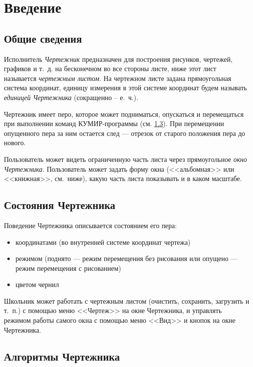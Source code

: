 \documentclass[12pt,a4paper]{article}
\begin{document}

\section{Введение}

\subsection{Общие сведения}

Исполнитель \emph{Чертежник} предназначен для построения рисунков, чертежей, графиков и т.~д. на бесконечном во все стороны листе, ниже этот лист называется  \emph{чертежным \mbox{листом}}. На чертежном листе  задана прямоугольная система координат, единицу измерения в этой системе координат будем называть \emph{единицей Чертежника} (сокращенно – е.~ч.).

Чертежник имеет перо, которое может подниматься, опускаться и перемещаться при выполнении команд КУМИР-программы (см. \ref{drawcommands}). При перемещении опущенного пера за ним остается след --- отрезок от старого положения пера до нового. 

	Пользователь может видеть ограниченную часть листа через прямоугольное \emph{окно \mbox{Чертежника}}. Пользователь может задать форму окна (<<альбомная>> или <<книжная>>, см.~ниже), какую часть листа показывать и в каком масштабе.

\subsection{Состояния Чертежника}
\label{drawstates}

Поведение Чертежника описывается состоянием его пера:
\begin{itemize}
\item координатами (во внутренней системе координат чертежа)
\item режимом (поднято --- режим перемещения без рисования или опущено --- режим перемещения с рисованием)
\item цветом чернил
\end{itemize}
Школьник может работать с чертежным  листом (очистить, сохранить, загрузить и т.~п.) с помощью меню <<Чертеж>> на окне Чертежника, и управлять режимом работы самого окна с помощью меню <<Вид>> и кнопок на окне Чертежника. 

\subsection{Алгоритмы Чертежника}
\label{drawcommands}
\end{document}
